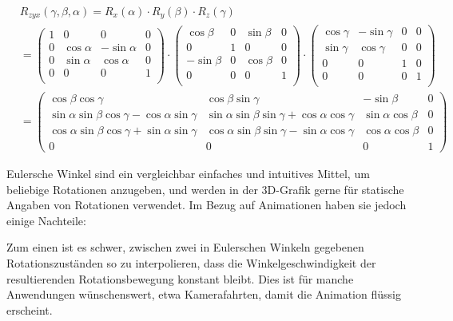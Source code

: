 \begin{equation}
\begin{split}
 &R_{zyx}( \gamma, \beta, \alpha ) = R_x( \alpha ) \cdot R_y( \beta ) \cdot R_z( \gamma ) \\
 &=
 \begin{pmatrix}
  1 & 0 & 0 & 0 \\
  0 & \cos \alpha & -\sin \alpha & 0 \\
  0 & \sin \alpha &  \cos \alpha & 0 \\
  0 & 0 & 0 & 1 \\
 \end{pmatrix} \cdot
 \begin{pmatrix}
  \cos \beta & 0 & \sin \beta & 0 \\
  0 & 1 & 0 & 0 \\
  -\sin \beta & 0 & \cos \beta & 0 \\
  0 & 0 & 0 & 1 \\
 \end{pmatrix} \cdot
 \begin{pmatrix}
  \cos \gamma & -\sin \gamma & 0 & 0 \\
  \sin \gamma &  \cos \gamma & 0 & 0 \\
  0 & 0 & 1 & 0 \\
  0 & 0 & 0 & 1 \\
 \end{pmatrix} \\
 &=
 \begin{pmatrix}
  \cos \beta \cos \gamma & \cos \beta \sin \gamma & - \sin \beta & 0 \\
  \sin \alpha \sin \beta \cos \gamma - \cos \alpha \sin \gamma & \sin \alpha \sin \beta \sin \gamma + \cos \alpha \cos \gamma & \sin \alpha \cos \beta & 0\\
  \cos \alpha \sin \beta \cos \gamma + \sin \alpha \sin \gamma & \cos \alpha \sin \beta \sin \gamma - \sin \alpha \cos \gamma & \cos \alpha \cos \beta & 0\\
  0 & 0 & 0 & 1
 \end{pmatrix}
\end{split}
\end{equation}

Eulersche Winkel sind ein vergleichbar einfaches und intuitives Mittel, um beliebige Rotationen anzugeben, und werden in der 3D-Grafik gerne für statische Angaben von Rotationen verwendet. Im Bezug auf Animationen haben sie jedoch einige Nachteile:

Zum einen ist es schwer, zwischen zwei in Eulerschen Winkeln gegebenen Rotationszuständen so zu interpolieren, dass die Winkelgeschwindigkeit der resultierenden Rotationsbewegung konstant bleibt. Dies ist für manche Anwendungen wünschenswert, etwa Kamerafahrten, damit die Animation flüssig erscheint.


